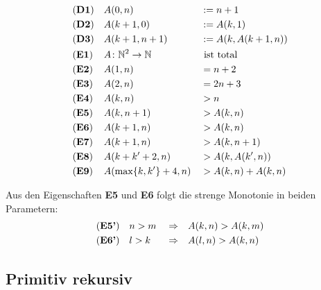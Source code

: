 \documentclass[a4paper]{amsart}
\theoremstyle{definition}
\newcommand{\N}{\ensuremath{\mathbb{ N }}}
\begin{document}
\begin{align*}
    &\text{(\textbf{D1})} && A( 0, n )                   &&:= n+1\\
    &\text{(\textbf{D2})} && A( k+1, 0 )                 &&:= A( k, 1 )\\
    &\text{(\textbf{D3})} && A( k+1, n+1 )               &&:= A( k, A(k+1, n) )\\
    &\text{(\textbf{E1})} && A \colon \N^2 \to \N        &&\text{ ist total}\\
    &\text{(\textbf{E2})} && A( 1, n )                   &&= n+2\\
    &\text{(\textbf{E3})} && A( 2, n )                   &&= 2n+3\\
    &\text{(\textbf{E4})} && A( k, n )                   &&> n\\
    &\text{(\textbf{E5})} && A( k, n+1 )                 &&> A( k, n )\\
    &\text{(\textbf{E6})} && A( k+1, n )                 &&> A( k, n )\\
    &\text{(\textbf{E7})} && A( k+1, n )                 &&> A( k, n+1 )\\
    &\text{(\textbf{E8})} && A( k+k'+2, n )              &&> A( k, A( k',n) )\\
    &\text{(\textbf{E9})} && A( \max \{k, k' \} + 4, n ) &&> A( k, n ) + A( k, n )
\end{align*}

Aus den Eigenschaften \textbf{E5} und \textbf{E6} folgt die strenge Monotonie in beiden Parametern:
\begin{align*}
    &\text{(\textbf{E5'})} && n >  m &&\Rightarrow &&A( k, n )  > A( k, m )\\
    &\text{(\textbf{E6'})} && l >  k &&\Rightarrow &&A( l, n )  > A( k, n )
\end{align*}


\subsection{Primitiv rekursiv}
\end{document}
